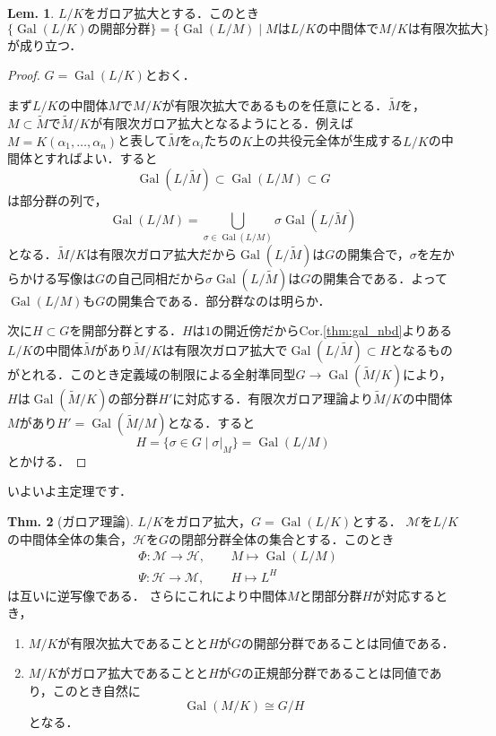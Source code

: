 \documentclass[dvipdfmx,b5paper,papersize]{jsarticle}
\theoremstyle{definition}
\newtheorem{thm}{Thm.}
\newtheorem{lem}[thm]{Lem.}
\DeclareMathOperator{\Gal}{Gal}
\begin{document}
\begin{lem}\label{thm:open_subgroup}
  $L/K$をガロア拡大とする．このとき
  \[
  \{\text{$\Gal(L/K)$の開部分群}
  \}
  =\{\Gal(L/M) \mid \text{$M$は$L/K$の中間体で$M/K$は有限次拡大}\}
  \]
  が成り立つ．
\end{lem}
\begin{proof}
  $G=\Gal(L/K)$とおく．

  まず$L/K$の中間体$M$で$M/K$が有限次拡大であるものを任意にとる．$\tilde{M}$を，$M \subset \tilde{M}$で$\tilde{M}/K$が有限次ガロア拡大となるようにとる．例えば$M=K(\alpha_1, \dots ,\alpha_n)$と表して$\tilde{M}$を$\alpha_i$たちの$K$上の共役元全体が生成する$L/K$の中間体とすればよい．すると
  \[
  \Gal(L/\tilde{M}) \subset \Gal(L/M) \subset G
  \]
  は部分群の列で，
  \[
  \Gal(L/M)=\bigcup_{\sigma \in \Gal(L/M)} \sigma \Gal(L/\tilde{M})
  \]
  となる．$\tilde{M}/K$は有限次ガロア拡大だから$\Gal(L/\tilde{M})$は$G$の開集合で，$\sigma$を左からかける写像は$G$の自己同相だから$\sigma \Gal(L/\tilde{M})$は$G$の開集合である．よって$\Gal(L/M)$も$G$の開集合である．部分群なのは明らか．

  次に$H \subset G$を開部分群とする．$H$は$1$の開近傍だからCor.\ref{thm:gal_nbd}よりある$L/K$の中間体$\tilde{M}$があり$\tilde{M}/K$は有限次ガロア拡大で$\Gal(L/\tilde{M}) \subset H$となるものがとれる．このとき定義域の制限による全射準同型$G \to \Gal(\tilde{M}/K)$により，$H$は$\Gal(\tilde{M}/K)$の部分群$H'$に対応する．有限次ガロア理論より$\tilde{M}/K$の中間体$M$があり$H'=\Gal(\tilde{M}/M)$となる．すると
  \[
  H=\{\sigma \in G \mid \sigma \lvert_M \}=\Gal(L/M)
  \]
  とかける．
\end{proof}

いよいよ主定理です．
\begin{thm}[ガロア理論]\label{thm:galois_theory}
  $L/K$をガロア拡大，$G=\Gal(L/K)$とする．
  $\mathcal{M}$を$L/K$の中間体全体の集合，$\mathcal{H}$を$G$の閉部分群全体の集合とする．このとき
  \begin{eqnarray*}
  &\Phi \colon \mathcal{M} \to \mathcal{H},&\hspace{15pt} M \mapsto \Gal(L/M)\\
  &\Psi \colon \mathcal{H}\to \mathcal{M},&\hspace{15pt} H \mapsto L^H
  \end{eqnarray*}
  は互いに逆写像である．
  さらにこれにより中間体$M$と閉部分群$H$が対応するとき，
  \begin{enumerate}
    \item $M/K$が有限次拡大であることと$H$が$G$の開部分群であることは同値である．
    \item $M/K$がガロア拡大であることと$H$が$G$の正規部分群であることは同値であり，このとき自然に
  \[
  \Gal(M/K) \cong G/H
  \]
  となる．
\end{enumerate}

\end{thm}
\end{document}
